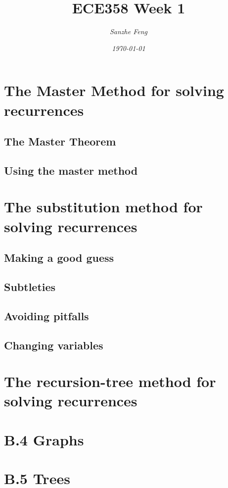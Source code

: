 \documentclass{article}
\begin{document}
\begin{titlepage}
	

\title{\textbf{ECE358 Week 1}}
\author{\textit{Sanzhe Feng}}
\date{\textit{\today}}
\maketitle
\end{titlepage}
\setlength{\parindent}{0pt}

\section*{The Master Method for solving recurrences}
\subsection*{The Master Theorem}
\subsection*{Using the master method}
\section*{The substitution method for solving recurrences}
\subsection*{Making a good guess}
\subsection*{Subtleties}
\subsection*{Avoiding pitfalls}
\subsection*{Changing variables}
\section*{The recursion-tree method for solving recurrences}
\section*{B.4 Graphs}
\section*{B.5 Trees}
\end{document}

